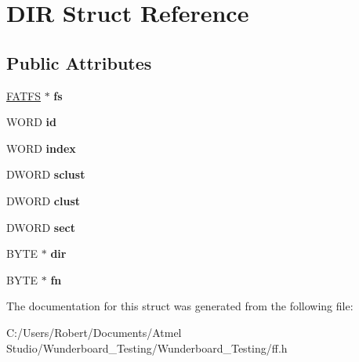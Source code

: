 \hypertarget{struct_d_i_r}{\section{D\-I\-R Struct Reference}
\label{struct_d_i_r}
}
\subsection*{Public Attributes}
\begin{DoxyCompactItemize}
\item 
\hypertarget{struct_d_i_r_a312eaa66cb703fb2993ea98173dc0c9a}{\hyperlink{struct_f_a_t_f_s}{F\-A\-T\-F\-S} $\ast$ {\bfseries fs}}\label{struct_d_i_r_a312eaa66cb703fb2993ea98173dc0c9a}

\item 
\hypertarget{struct_d_i_r_aca2c95a99a04173917ec70c030891383}{W\-O\-R\-D {\bfseries id}}\label{struct_d_i_r_aca2c95a99a04173917ec70c030891383}

\item 
\hypertarget{struct_d_i_r_ab95119fbacbe45e3e9ee0f962b844092}{W\-O\-R\-D {\bfseries index}}\label{struct_d_i_r_ab95119fbacbe45e3e9ee0f962b844092}

\item 
\hypertarget{struct_d_i_r_a9212af5877b94d790dd3bab3aa320994}{D\-W\-O\-R\-D {\bfseries sclust}}\label{struct_d_i_r_a9212af5877b94d790dd3bab3aa320994}

\item 
\hypertarget{struct_d_i_r_acfbb8ba2d6e73b6f999ceffd1857c190}{D\-W\-O\-R\-D {\bfseries clust}}\label{struct_d_i_r_acfbb8ba2d6e73b6f999ceffd1857c190}

\item 
\hypertarget{struct_d_i_r_ad01fcc812ed0dad11a593574336adc9e}{D\-W\-O\-R\-D {\bfseries sect}}\label{struct_d_i_r_ad01fcc812ed0dad11a593574336adc9e}

\item 
\hypertarget{struct_d_i_r_a6c2a8c0cf2d55ae99775e93a16593449}{B\-Y\-T\-E $\ast$ {\bfseries dir}}\label{struct_d_i_r_a6c2a8c0cf2d55ae99775e93a16593449}

\item 
\hypertarget{struct_d_i_r_a32da2f31d6c3b6c42eef981cb0cfd2ee}{B\-Y\-T\-E $\ast$ {\bfseries fn}}\label{struct_d_i_r_a32da2f31d6c3b6c42eef981cb0cfd2ee}

\end{DoxyCompactItemize}


The documentation for this struct was generated from the following file\-:\begin{DoxyCompactItemize}
\item 
C\-:/\-Users/\-Robert/\-Documents/\-Atmel Studio/\-Wunderboard\-\_\-\-Testing/\-Wunderboard\-\_\-\-Testing/ff.\-h\end{DoxyCompactItemize}
